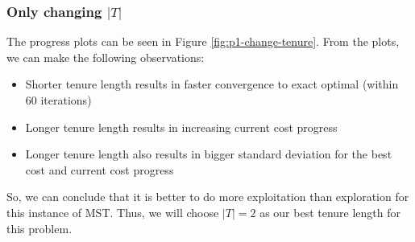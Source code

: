 \subsubsection{Only changing \(|T|\)}

The progress plots can be seen in Figure \ref{fig:p1-change-tenure}. From the plots, we can make the following observations:
\begin{itemize}
    \item Shorter tenure length results in faster convergence to exact optimal (within 60 iterations)
    \item Longer tenure length results in increasing current cost progress
    \item Longer tenure length also results in bigger standard deviation for the best cost and current cost progress
\end{itemize}

So, we can conclude that it is better to do more exploitation than exploration for this instance of MST. Thus, we will choose \(|T| = 2\) as our best tenure length for this problem.

